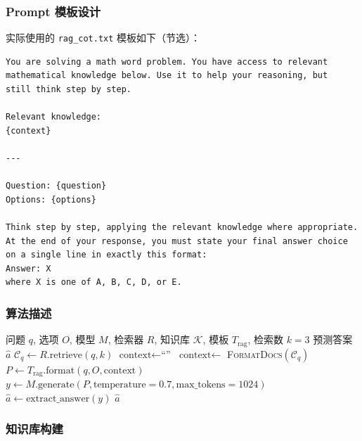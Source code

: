 \documentclass[lang=cn,a4paper,newtx]{elegantpaper}
\begin{document}
\subsubsection{Prompt 模板设计}

实际使用的 \texttt{rag\_cot.txt} 模板如下（节选）：

\begin{lstlisting}
You are solving a math word problem. You have access to relevant
mathematical knowledge below. Use it to help your reasoning, but
still think step by step.

Relevant knowledge:
{context}

---

Question: {question}
Options: {options}

Think step by step, applying the relevant knowledge where appropriate.
At the end of your response, you must state your final answer choice
on a single line in exactly this format:
Answer: X
where X is one of A, B, C, D, or E.
\end{lstlisting}

\subsubsection{算法描述}

\begin{algorithm}[htbp]
\caption{RAG + COT 策略}
\begin{algorithmic}[1]
\Require 问题 $q$, 选项 $O$, 模型 $M$, 检索器 $R$, 知识库 $\mathcal{K}$, 模板 $T_{\text{rag}}$, 检索数 $k=3$
\Ensure 预测答案 $\hat{a}$
\State $\mathcal{C}_q \gets R.\text{retrieve}(q, k)$ 
    \State $\text{context} \gets \text{``''}$ 
\Else
    \State $\text{context} \gets$ \textsc{FormatDocs}$(\mathcal{C}_q)$ 
\EndIf
\State $P \gets T_{\text{rag}}.\text{format}(q, O, \text{context})$ 
\State $y \gets M.\text{generate}(P, \text{temperature}=0.7, \text{max\_tokens}=1024)$
\State $\hat{a} \gets \text{extract\_answer}(y)$
\State \Return $\hat{a}$
\end{algorithmic}
\end{algorithm}

\subsubsection{知识库构建}
\end{document}
